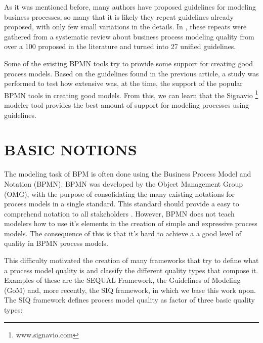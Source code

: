 \documentclass[a4paper,twoside]{article}
\begin{document}
As it was mentioned before, many authors have proposed guidelines for modeling business processes, so many that it is likely they repeat guidelines already proposed, with only few small variations in the details. In \cite{Moreno-MontesdeOca2014}, these repeats were gathered from a systematic review about business process modeling quality from over a 100 proposed in the literature and turned into 27 unified guidelines.  

Some of the existing BPMN tools try to provide some support for creating good process models. Based on the guidelines found in the previous article, a study \cite{MoniqueSnoeckIsel2015} was performed to test how extensive was, at the time, the support of the popular BPMN tools in creating good models. From this, we can learn that the Signavio \footnote{www.signavio.com} modeler tool provides the best amount of support for modeling processes using guidelines. 


\section{BASIC NOTIONS}\label{Fundamentals}\label{Background}

\noindent The modeling task of BPM is often done using the Business Process Model and Notation (BPMN). BPMN was developed by the Object Management Group (OMG), with the purpose of consolidating the many existing notations for process models in a single standard. This standard should provide a easy to comprehend notation to all stakeholders \cite{OMGObjectManagementGroup2015}. However, BPMN does not teach modelers how to use it's elements in the creation of simple and expressive process models. The consequence of this is that it's hard to achieve a a good level of quality in BPMN process models.


This difficulty motivated the creation of many frameworks that try to define what a process model quality is and classify the different quality types that compose it. Examples of these are the SEQUAL Framework, the Guidelines of Modeling (GoM) and, more recently, the SIQ framework, in which we base this work upon. The SIQ framework defines process model quality as factor of three basic quality types:
\end{document}

